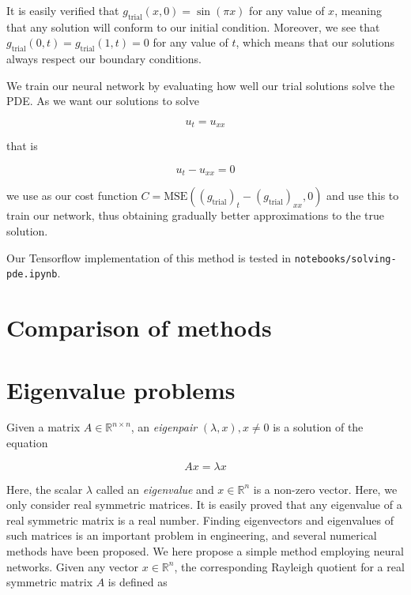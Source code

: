 \documentclass{article}
\begin{document}
It is easily verified that $g_{\textrm{trial}}(x, 0) = \sin(\pi x)$ for any value of $x$, meaning that any solution will conform to our initial condition. Moreover, we see that $g_{\textrm{trial}}(0, t) = g_{\textrm{trial}}(1, t) = 0$ for any value of $t$, which means that our solutions always respect our boundary conditions.

We train our neural network by evaluating how well our trial solutions solve the PDE. As we want our solutions to solve

\begin{equation}
    u_t = u_{xx}
\end{equation}

that is

\begin{equation}
    u_t - u_{xx} = 0
\end{equation}

we use as our cost function $C = \textrm{MSE}((g_{\textrm{trial}})_t - (g_{\textrm{trial}})_{xx}, 0)$ and use this to train our network, thus obtaining gradually better approximations to the true solution.

Our Tensorflow implementation of this method is tested in \texttt{notebooks/solving-pde.ipynb}.
\section{Comparison of methods}

\section{Eigenvalue problems}
Given a matrix $A \in \mathbb{R}^{n \times n}$, an \textit{eigenpair} $(\lambda, x), x \neq 0$ is a solution of the equation

\begin{equation}
    Ax = \lambda x
\end{equation}

Here, the scalar $\lambda$ called an \textit{eigenvalue} and $x \in \mathbb{R}^n$ is a non-zero vector. Here, we only consider real symmetric matrices. It is easily proved that any eigenvalue of a real symmetric matrix is a real number. Finding eigenvectors and eigenvalues of such matrices is an important problem in engineering, and several numerical methods have been proposed. We here propose a simple method employing neural networks. Given any vector $x \in \mathbb{R}^n$, the corresponding Rayleigh quotient for a real symmetric matrix $A$ is defined as
\end{document}
